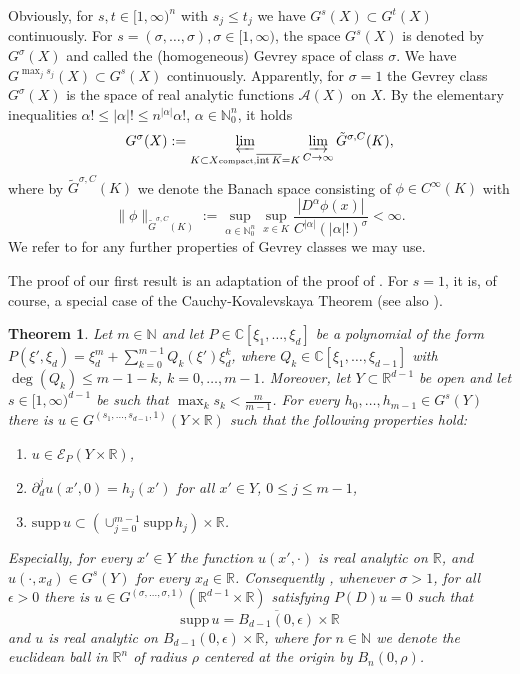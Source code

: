 \documentclass[a4paper,10pt]{amsart}
\newtheorem{theorem}{Theorem}
\newtheorem*{crucial lemma}{Lemma \ref{lem:nice polynomial2}}
\theoremstyle{definition}
\newcommand{\R}{\mathbb{R}}
\newcommand{\C}{\mathbb{C}}
\newcommand{\N}{\mathbb{N}}
\newcommand{\supp}{\mbox{supp}\,}
\begin{document}
Obviously, for $s,t\in [1,\infty)^n$ with $s_j\leq t_j$ we have $G^{s}(X)\subset G^{t}(X)$ continuously.   For $s=(\sigma,\ldots,\sigma), \sigma\in[1,\infty)$, the space $G^s(X)$ is denoted by $G^\sigma(X)$ and called the (homogeneous) Gevrey space of class $\sigma$. We have $G^{\max_j s_j}(X)\subset G^s(X)$ continuously. Apparently, for $\sigma=1$ the Gevrey class $G^\sigma(X)$ is the space of real analytic functions $\mathscr{A}(X)$ on $X$. By the elementary inequalities $\alpha!\leq |\alpha|!\leq n^{|\alpha|}\alpha!$, $\alpha\in\N_0^n$, it holds
$$G^\sigma(X):=\varprojlim_{K \subset X\mbox{\tiny compact,} \overline{\operatorname{int}K}=K} \varinjlim_{C\rightarrow \infty}\tilde{G}^{\sigma,C}(K),$$
where by $\tilde{G}^{\sigma,C}(K)$ we denote the Banach space consisting of $\phi\in C^\infty(K)$ with
\[\|\phi\|_{\tilde{G}^{\sigma,C}(K)}:=\sup_{\alpha\in\N_0^n}\sup_{x\in K}\frac{|D^\alpha\phi(x)|}{C^{|\alpha|} (|\alpha|!)^\sigma}<\infty.\] 
We refer to \cite{Rodino1993} for any further properties of Gevrey classes we may use.

The proof of our first result is an adaptation of the proof of \cite[Theorem 5]{Kalmes2021}. For $s=1$, it is, of course, a special case of the Cauchy-Kovalevskaya Theorem (see also \cite[Theorem 12.7.5]{Hor2}).

\begin{theorem}\label{cohoon-solution}
	Let $m\in\N$ and let $P\in\C[\xi_1,\ldots,\xi_d]$ be a polynomial of the form $P(\xi',\xi_d)=\xi_d^m+\sum_{k=0}^{m-1}Q_k(\xi') \xi_d^k$, where $Q_k\in\C[\xi_1,\ldots,\xi_{d-1}]$ with $\operatorname{deg}(Q_k)\leq m-1-k$, $k=0,\ldots, m-1$. Moreover, let $Y\subset\R^{d-1}$ be open and let $s\in[1,\infty)^{d-1}$ be such that $\max_k s_k<\frac{m}{m-1}$. For every $h_0, \ldots, h_{m-1}\in G^s(Y)$ there is $u\in G^{(s_1,\ldots,s_{d-1},1)}(Y\times\R)$ such that the following properties hold:
	\begin{enumerate}[{\upshape(i)}]
		\item $u\in\mathscr{E}_P(Y\times\R)$, 
		\item $\partial^{j}_{d}u(x',0)=h_j(x')$ for all $x'\in Y$, $0\leq j\leq m-1$,
		\item $\supp u\subset\left(\cup_{j=0}^{m-1}\supp h_j\right)\times\R$.
	\end{enumerate}
	Especially, for every $x'\in Y$ the function $u(x',\cdot)$ is real analytic on $\R$, and $u(\cdot, x_d)\in G^s(Y)$ for every $x_d\in\R$.
	Consequently , whenever $\sigma>1$, for all $\epsilon>0$ there is $u\in G^{(\sigma,\ldots,\sigma,1)}(\R^{d-1}\times \R)$ satisfying $P(D)u=0$ such that
	\[ \supp u= \overline{B_{d-1}(0,\epsilon)}\times\R\] 
    and $u$ is real analytic on $B_{d-1}(0,\epsilon)\times\R$, where for $n\in\N$ we denote the euclidean ball in $\R^n$ of radius $\rho$ centered at the origin by $B_n(0,\rho)$.
\end{theorem}
\end{document}
